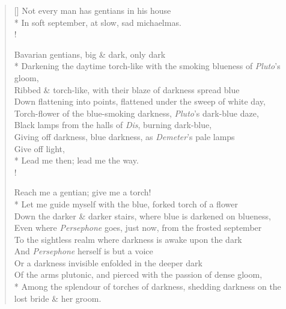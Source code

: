 \documentclass[MAIN]{subfiles}
\begin{document}
\begin{verse}[\versewidth]
Not every man has gentians in his house\\*
In soft september, at slow, sad michaelmas.\\!

Bavarian gentians, big \& dark, only dark\\*
Darkening the daytime torch-like with the smoking blueness of \emph{Pluto}'s gloom,\\
Ribbed \& torch-like, with their blaze of darkness spread blue\\
Down flattening into points, flattened under the sweep of white day,\\
Torch-flower of the blue-smoking darkness, \emph{Pluto}'s dark-blue daze,\\
Black lamps from the halls of \emph{Dis}, burning dark-blue,\\
Giving off darkness, blue darkness, as \emph{Demeter}'s pale lamps\\
Give off light,\\*
Lead me then; lead me the way.\\!

Reach me a gentian; give me a torch!\\*
Let me guide myself with the blue, forked torch of a flower\\
Down the darker \& darker stairs, where blue is darkened on blueness,\\
Even where \emph{Persephone} goes, just now, from the frosted september\\
To the sightless realm where darkness is awake upon the dark\\
And \emph{Persephone} herself is but a voice\\
Or a darkness invisible enfolded in the deeper dark\\
Of the arms plutonic, and pierced with the passion of dense gloom,\\*
Among the splendour of torches of darkness, shedding darkness on the lost bride \& her groom.
\end{verse}
\end{document}
